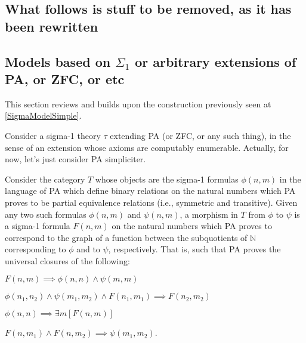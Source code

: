 \subsection{What follows is stuff to be removed, as it has been rewritten}

\subsection{Models based on \texorpdfstring{$\Sigma_1$}{Sigma-1} or arbitrary extensions of PA, or ZFC, or etc}

This section reviews and builds upon the construction previously seen at \cref{SigmaModelSimple}.

\begin{construction}\label{Sigma1Model}

Consider a sigma-1 theory $\tau$ extending PA (or ZFC, or any such thing), in the sense of an extension whose axioms are computably enumerable. Actually, for now, let's just consider PA simpliciter.


Consider the category $T$ whose objects are the sigma-1 formulas $\phi(n, m)$ in the language of PA which define binary relations on the natural numbers which PA proves to be partial equivalence relations (i.e., symmetric and transitive). Given any two such formulas $\phi(n, m)$ and $\psi(n, m)$, a morphism in $T$ from $\phi$ to $\psi$ is a sigma-1 formula $F(n, m)$ on the natural numbers which PA proves to correspond to the graph of a function between the subquotients of $\mathbb{N}$ corresponding to $\phi$ and to $\psi$, respectively. That is, such that PA proves the universal closures of the following:

$F(n, m) \implies \phi(n, n) \wedge \psi(m, m)$

$\phi(n_1, n_2) \wedge \psi(m_1, m_2) \wedge F(n_1, m_1) \implies F(n_2, m_2)$

$\phi(n, n) \implies \exists m [F(n, m)]$

$F(n, m_1) \wedge F(n, m_2) \implies \psi(m_1, m_2)$.


\end{construction}
